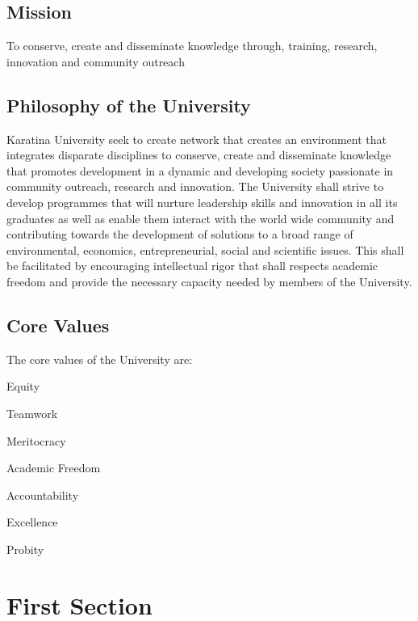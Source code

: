\documentclass[16,a4paperpaper,]{article}
\begin{document}
\subsection{Mission}

To conserve, create and disseminate knowledge through, training,
research, innovation and community outreach

\subsection{Philosophy of the University}

Karatina University seek to create network that creates an environment
that integrates disparate disciplines to conserve, create and
disseminate knowledge that promotes development in a dynamic and
developing society passionate in community outreach, research and
innovation. The University shall strive to develop programmes that will
nurture leadership skills and innovation in all its graduates as well as
enable them interact with the world wide community and contributing
towards the development of solutions to a broad range of environmental,
economics, entrepreneurial, social and scientific issues. This shall be
facilitated by encouraging intellectual rigor that shall respects
academic freedom and provide the necessary capacity needed by members of
the University.

\subsection{Core Values}

The core values of the University are:

\begin{center}

Equity

Teamwork

Meritocracy

Academic Freedom

Accountability

Excellence

Probity

\end{center}

\section{First Section}
\end{document}
